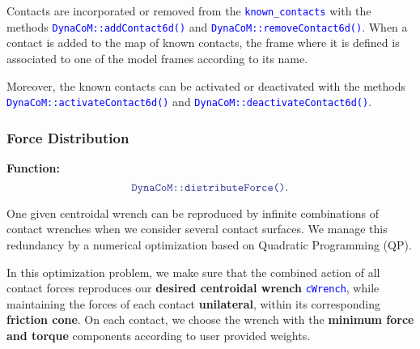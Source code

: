 \documentclass[12pt]{article}
\newcommand{\code}[2][Blue]{\textcolor{#1}{\texttt{#2}}}
\begin{document}
Contacts are incorporated or removed from the \code{known\_contacts} with the methods \code{DynaCoM::addContact6d()} and \code{DynaCoM::removeContact6d()}. When a contact is added to the map of known contacts, the frame where it is defined is associated to one of the model frames according to its name.

Moreover, the known contacts can be activated or deactivated with the methods \code{DynaCoM::activateContact6d()} and \code{DynaCoM::deactivateContact6d()}.

\subsubsection{Force Distribution} \label{Sec.ForceDist}

{\bf Function:}
\begin{equation*}
    \code{DynaCoM::distributeForce()}.
\end{equation*}

One given centroidal wrench can be reproduced by infinite combinations of contact wrenches when we consider several contact surfaces. We manage this redundancy by a numerical optimization based on Quadratic Programming (QP).

In this optimization problem, we make sure that the combined action of all contact forces reproduces our {\bf desired centroidal wrench} \code{cWrench}, while maintaining the forces of each contact {\bf unilateral}, within its corresponding {\bf friction cone}. On each contact, we choose the wrench with the {\bf minimum force and torque} components according to user provided weights.
\end{document}

